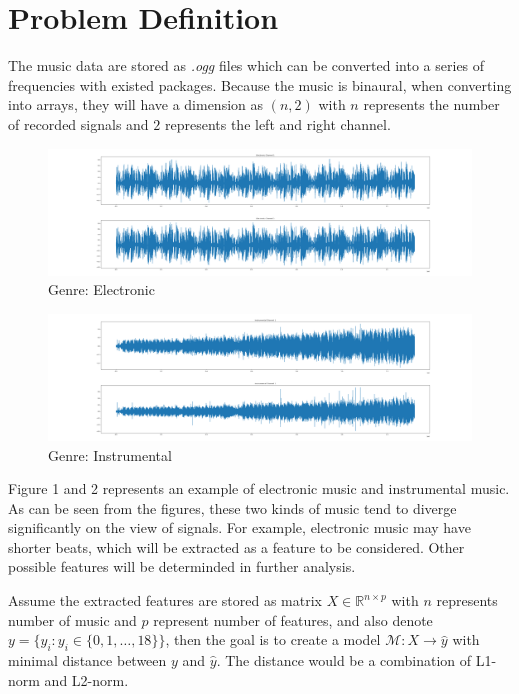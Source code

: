\documentclass[sigconf ,nonacm]{acmart}
\begin{document}
\section{Problem Definition}
The music data are stored as {\it .ogg} files which can be converted into a series of frequencies with existed packages. Because the music is binaural, when converting into arrays, they will have a dimension as $(n,2)$ with $n$ represents the number of recorded signals and $2$ represents the left and right channel. 
\begin{figure}
  \includegraphics[width=\columnwidth]{Electronic.png}
  \caption{Genre: Electronic}
\end{figure}
\begin{figure}
  \includegraphics[width=\columnwidth]{Instrumental.png}
  \caption{Genre: Instrumental}
\end{figure}

Figure 1 and 2 represents an example of electronic music and instrumental music. As can be seen from the figures, these two kinds of music tend to diverge significantly on the view of signals. For example, electronic music may have shorter beats, which will be extracted as a feature to be considered. Other possible features will be determinded in further analysis. 

Assume the extracted features are stored as matrix $X \in \mathbb{R}^{n\times p}$ with $n$ represents number of music and $p$ represent number of features, and also denote $y = \{y_i : y_i \in \{0,1,\ldots,18\}\}$, then the goal is to create a model $\mathcal{M}: X \to \hat{y}$ with minimal distance between $y$ and $\hat{y}$. The distance would be a combination of L1-norm and L2-norm.
\end{document}
